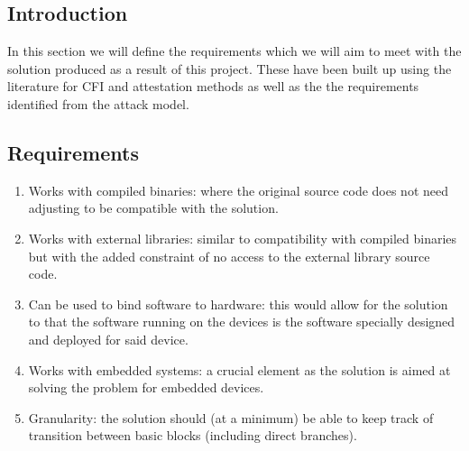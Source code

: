 \subsection{Introduction}

In this section we will define the requirements which we will aim to meet with the solution produced as a result of this project. These have been built up using the literature for CFI and attestation methods as well as the the requirements identified from the attack model.

\subsection{Requirements}

\begin{enumerate}
	\item Works with compiled binaries: where the original source code does not need adjusting to be compatible with the solution.
	\item Works with external libraries: similar to compatibility with compiled binaries but with the added constraint of no access to the external library source code. 
	\item Can be used to bind software to hardware: this would allow for the solution to that the software running on the devices is the software specially designed and deployed for said device.
	\item Works with embedded systems: a crucial element as the solution is aimed at solving the problem for embedded devices.
	\item Granularity: the solution should (at a minimum) be able to keep track of transition between basic blocks (including direct branches).
\end{enumerate}
